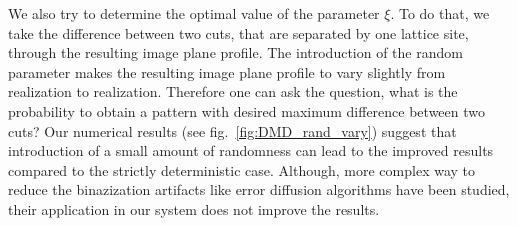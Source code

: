 We also try to determine the optimal value of the parameter $\xi$. To do that, we take the difference between two cuts, that are separated by one lattice site, through the resulting image plane profile. The introduction of the random parameter makes the resulting image plane profile to vary slightly from realization to realization. Therefore one can ask the question, what is the probability to obtain a pattern with desired maximum difference between two cuts? Our numerical results (see fig.~\ref{fig:DMD_rand_vary}) suggest that introduction of a small amount of randomness can lead to the improved results compared to the strictly deterministic case. Although, more complex way to reduce the binazization artifacts like error diffusion algorithms \cite{floyd, Hu2018} have been studied, their application in our system does not improve the results. 

